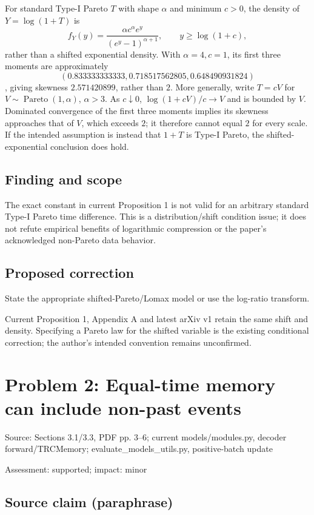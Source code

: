 \documentclass[11pt]{article}
\begin{document}
For standard Type-I Pareto \(T\) with shape \(\alpha\) and minimum \(c>0\), the density of \(Y=\log(1+T)\) is \[f_Y(y)=\frac{\alpha c^\alpha e^y}{(e^y-1)^{\alpha+1}},\qquad y\ge\log(1+c),\] rather than a shifted exponential density. With \(\alpha=4,c=1\), its first three moments are approximately \[(0.833333333333,0.718517562805,0.648490931824)\], giving skewness \(2.571420899\), rather than \(2\). More generally, write \(T=cV\) for \(V\sim\operatorname{Pareto}(1,\alpha)\), \(\alpha>3\). As \(c\downarrow0\), \(\log(1+cV)/c\to V\) and is bounded by \(V\). Dominated convergence of the first three moments implies its skewness approaches that of \(V\), which exceeds \(2\); it therefore cannot equal \(2\) for every scale. If the intended assumption is instead that \(1+T\) is Type-I Pareto, the shifted-exponential conclusion does hold.

\subsection*{Finding and scope}

The exact constant in current Proposition 1 is not valid for an arbitrary standard Type-I Pareto time difference. This is a distribution/shift condition issue; it does not refute empirical benefits of logarithmic compression or the paper’s acknowledged non-Pareto data behavior.

\subsection*{Proposed correction}

State the appropriate shifted-Pareto/Lomax model or use the log-ratio transform.

Current Proposition 1, Appendix A and latest arXiv v1 retain the same shift and density. Specifying a Pareto law for the shifted variable is the existing conditional correction; the author’s intended convention remains unconfirmed.

\section*{Problem 2: Equal-time memory can include non-past events}

Source: Sections 3.1/3.3, PDF pp. 3–6; current models/modules.py, decoder forward/TRCMemory; evaluate\_models\_utils.py, positive-batch update

Assessment: supported; impact: minor

\subsection*{Source claim (paraphrase)}
\end{document}
